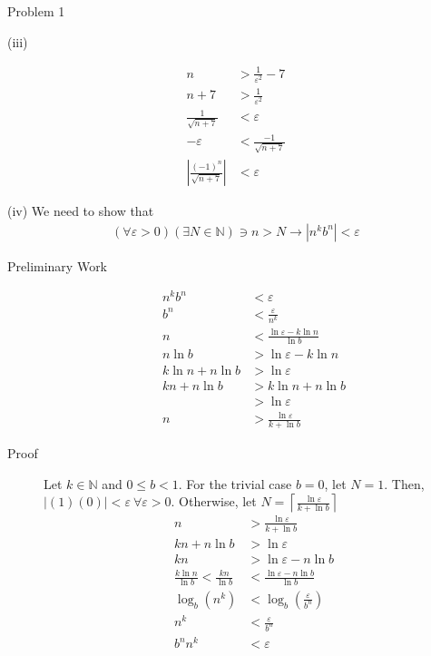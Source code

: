 \documentclass[10pt]{extarticle}
\newcommand{\N}{\mathbb{N}}
\begin{document}
\begin{problem}{Problem 1}
\begin{problem}{(iii)}
\begin{description}
          \begin{align*}
            n &> \frac{1}{\varepsilon^2} - 7\\
            n + 7 &> \frac{1}{\varepsilon^2}\\
            \frac{1}{\sqrt{n+7}} & < \varepsilon\\
            -\varepsilon &< \frac{-1}{\sqrt{n+7}}\\
            \left|\frac{(-1)^{n}}{\sqrt{n+7}}\right| & < \varepsilon
          \end{align*}
      \end{description}
    \end{problem}
    \begin{problem}{(iv)}
      We need to show that
      \begin{align*}
        (\forall \varepsilon > 0)(\exists N\in\N) \ni n > N \rightarrow \left|n^kb^n\right| < \varepsilon
      \end{align*}
      \begin{description}
        \item[Preliminary Work]
          \begin{align*}
            n^kb^n & < \varepsilon \\
            b^n &< \frac{\varepsilon}{n^k}\\
            n &< \frac{\ln \varepsilon - k\ln n}{\ln b}\\
            n\ln b &> \ln \varepsilon - k\ln n\\
            k\ln n + n\ln b &> \ln\varepsilon\\
            kn + n\ln b &> k\ln n + n\ln b\\
                        &> \ln\varepsilon\\
            n &> \frac{\ln \varepsilon}{k + \ln b}
          \end{align*}
        \item[Proof] Let $k\in\N$ and $0\leq b < 1$. For the trivial case $b = 0$, let $N = 1$. Then, $|(1)(0)| < \varepsilon~\forall \varepsilon > 0$. Otherwise, let $\displaystyle N = \left\lceil\frac{\ln\varepsilon}{k + \ln b}\right\rceil$
          \begin{align*}
            n &> \frac{\ln\varepsilon}{k + \ln b}\\
            kn + n\ln b &> \ln\varepsilon\\
            kn &> \ln\varepsilon - n\ln b\\
            \frac{k\ln n}{\ln b}<\frac{kn}{\ln b} &< \frac{\ln\varepsilon - n\ln b}{\ln b}\tag*{since $\ln b < 0$}\\
            \log_b\left(n^k\right) &< \log_b\left(\frac{\varepsilon}{b^n}\right)\\
            n^k &< \frac{\varepsilon}{b^n}\\
            b^n n^k &< \varepsilon
          \end{align*}
      \end{description}
    \end{problem}
  \end{problem}
\end{document}
